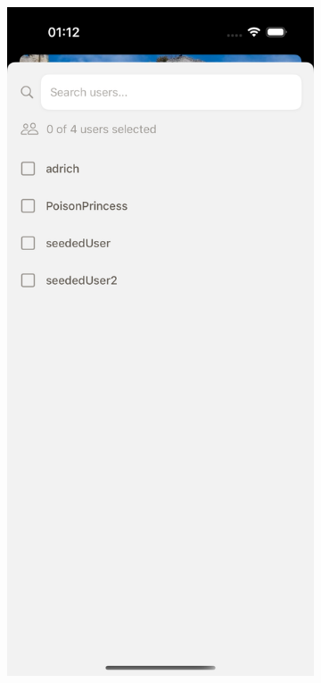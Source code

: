 \begin{figure}[H]
    \centering
    \begin{subfigure}[b]{0.36\textwidth}
        \centering
        \includegraphics[width=\textwidth]{images/implementacija/editing-options/manage-users.png}

\end{subfigure}
\end{figure}
